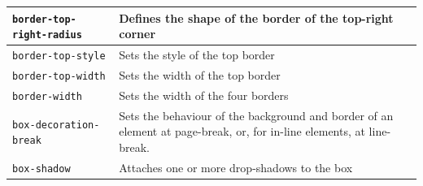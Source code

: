 \documentclass[11pt, letterpaper]{article}
\begin{document}
\begin{longtable}{p{5cm} p{10cm}}
				\texttt{border-top-right-radius} & Defines the shape of the border of the top-right corner \\\midrule
				\texttt{border-top-style} & Sets the style of the top border \\\midrule
				\texttt{border-top-width} & Sets the width of the top border \\\midrule
				\texttt{border-width} & Sets the width of the four borders \\\midrule
				\texttt{box-decoration-break} & Sets the behaviour of the background and border of an element at page-break, or, for in-line elements, at line-break. \\\midrule
				\texttt{box-shadow} & Attaches one or more drop-shadows to the box \\\bottomrule
			\end{longtable}
		
\end{document}

